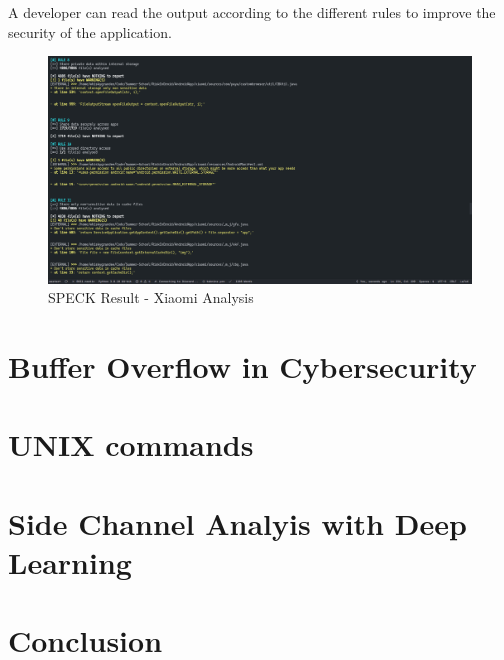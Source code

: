\documentclass[runningheads]{llncs}
\begin{document}
A developer can read the output according to the different rules to improve the security of the application. 

\begin{figure}
    \includegraphics[width=\textwidth]{images/SPECK.png}
    \caption{SPECK Result - Xiaomi Analysis} \label{fig4}
\end{figure}

\section{Buffer Overflow in Cybersecurity}




\section{UNIX commands}

\section{Side Channel Analyis with Deep Learning}

\section{Conclusion}
\end{document}
